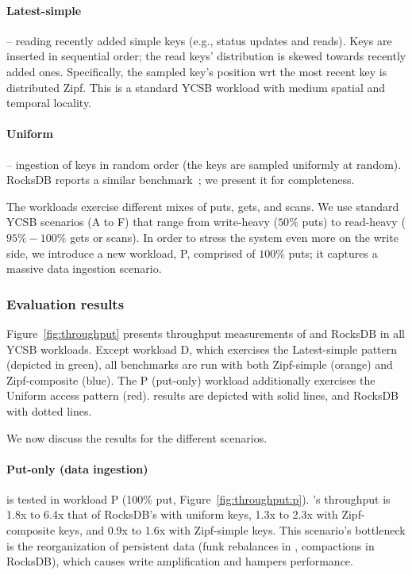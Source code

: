 \paragraph{Latest-simple} -- reading  recently added simple keys (e.g., status updates and reads). 
Keys are inserted in sequential  order; the read keys' distribution is skewed towards recently added ones. 
Specifically, the sampled key's position wrt the most recent key is distributed Zipf. This is a 
standard YCSB workload with medium spatial and temporal locality.

\paragraph{Uniform} -- ingestion of keys in random order (the keys are sampled uniformly at random). RocksDB
reports a similar benchmark~\cite{rocksdb-benchmarks}; we present it for completeness.

The workloads exercise different mixes of puts, gets, and scans. We use standard YCSB scenarios 
(A to F) that range from write-heavy ($50\%$ puts) to read-heavy ($95\%-100\%$ gets or scans). 
In order to stress the system even more on the write side, we introduce a new workload,  
P, comprised of $100\%$ puts; it captures a massive data ingestion scenario. 

\subsubsection{Evaluation results}
Figure~\ref{fig:throughput} presents throughput measurements of \sys\/ and RocksDB
in all YCSB workloads. Except workload D, which exercises the Latest-simple pattern
(depicted in green), all benchmarks are run with both  Zipf-simple (orange) 
and Zipf-composite (blue). The P (put-only) workload 
additionally exercises the Uniform access pattern (red). \sys\/ results are depicted with solid
lines, and RocksDB with dotted lines. 

We now discuss the results for the different scenarios.
  
\paragraph{ Put-only (data ingestion)} is tested in workload
{P} (100\% put, Figure~\ref{fig:throughput:p}). 
\sys's throughput is 1.8x to 6.4x that of RocksDB's with uniform keys, 1.3x to 2.3x with Zipf-composite keys, 
and 0.9x to 1.6x with Zipf-simple keys. This scenario's bottleneck is the reorganization of persistent data  
(funk rebalances in \sys, compactions in RocksDB), which causes write amplification and hampers performance. 
 
